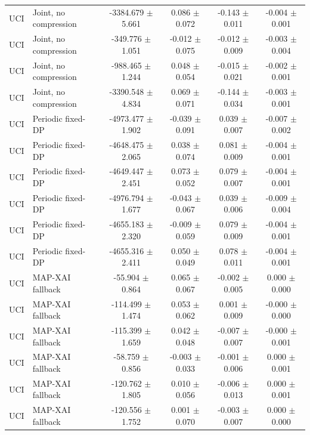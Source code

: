 \begin{table}[t]
\begin{tabular}{llcccc}
UCI & Joint, no compression & -3384.679 $\pm$ 5.661 & 0.086 $\pm$ 0.072 & -0.143 $\pm$ 0.011 & -0.004 $\pm$ 0.001 \\
UCI & Joint, no compression & -349.776 $\pm$ 1.051 & -0.012 $\pm$ 0.075 & -0.012 $\pm$ 0.009 & -0.003 $\pm$ 0.004 \\
UCI & Joint, no compression & -988.465 $\pm$ 1.244 & 0.048 $\pm$ 0.054 & -0.015 $\pm$ 0.021 & -0.002 $\pm$ 0.001 \\
UCI & Joint, no compression & -3390.548 $\pm$ 4.834 & 0.069 $\pm$ 0.071 & -0.144 $\pm$ 0.034 & -0.003 $\pm$ 0.001 \\
UCI & Periodic fixed-DP & -4973.477 $\pm$ 1.902 & -0.039 $\pm$ 0.091 & 0.039 $\pm$ 0.007 & -0.007 $\pm$ 0.002 \\
UCI & Periodic fixed-DP & -4648.475 $\pm$ 2.065 & 0.038 $\pm$ 0.074 & 0.081 $\pm$ 0.009 & -0.004 $\pm$ 0.001 \\
UCI & Periodic fixed-DP & -4649.447 $\pm$ 2.451 & 0.073 $\pm$ 0.052 & 0.079 $\pm$ 0.007 & -0.004 $\pm$ 0.001 \\
UCI & Periodic fixed-DP & -4976.794 $\pm$ 1.677 & -0.043 $\pm$ 0.067 & 0.039 $\pm$ 0.006 & -0.009 $\pm$ 0.004 \\
UCI & Periodic fixed-DP & -4655.183 $\pm$ 2.320 & -0.009 $\pm$ 0.059 & 0.079 $\pm$ 0.009 & -0.004 $\pm$ 0.001 \\
UCI & Periodic fixed-DP & -4655.316 $\pm$ 2.411 & 0.050 $\pm$ 0.049 & 0.078 $\pm$ 0.011 & -0.004 $\pm$ 0.001 \\
UCI & MAP-XAI fallback & -55.904 $\pm$ 0.864 & 0.065 $\pm$ 0.067 & -0.002 $\pm$ 0.005 & 0.000 $\pm$ 0.000 \\
UCI & MAP-XAI fallback & -114.499 $\pm$ 1.474 & 0.053 $\pm$ 0.062 & 0.001 $\pm$ 0.009 & -0.000 $\pm$ 0.000 \\
UCI & MAP-XAI fallback & -115.399 $\pm$ 1.659 & 0.042 $\pm$ 0.048 & -0.007 $\pm$ 0.007 & -0.000 $\pm$ 0.001 \\
UCI & MAP-XAI fallback & -58.759 $\pm$ 0.856 & -0.003 $\pm$ 0.033 & -0.001 $\pm$ 0.006 & 0.000 $\pm$ 0.001 \\
UCI & MAP-XAI fallback & -120.762 $\pm$ 1.805 & 0.010 $\pm$ 0.056 & -0.006 $\pm$ 0.013 & 0.000 $\pm$ 0.001 \\
UCI & MAP-XAI fallback & -120.556 $\pm$ 1.752 & 0.001 $\pm$ 0.070 & -0.003 $\pm$ 0.007 & 0.000 $\pm$ 0.000 \\
\bottomrule
\end{tabular}
\end{table}
